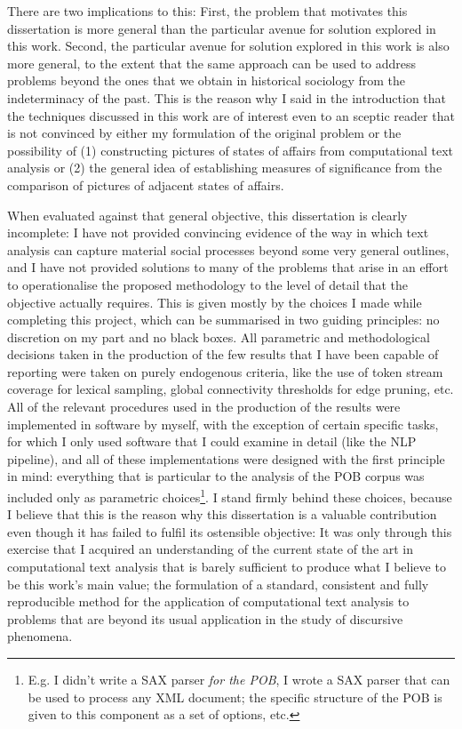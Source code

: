 There are two implications to this:
First, the problem that motivates this dissertation is more general than the particular avenue for solution explored in this work.
Second, the particular avenue for solution explored in this work is also more general, to the extent that the same approach can be used to address problems beyond the ones that we obtain in historical sociology from the indeterminacy of the past.
This is the reason why I said in the introduction that the techniques discussed in this work are of interest even to an sceptic reader that is not convinced by either my formulation of the original problem or the possibility of (1) constructing pictures of states of affairs from computational text analysis or (2) the general idea of establishing measures of significance from the comparison of pictures of adjacent states of affairs.

When evaluated against that general objective, this dissertation is clearly incomplete: I have not provided convincing evidence of the way in which text analysis can capture material social processes beyond some very general outlines, and I have not provided solutions to many of the problems that arise in an effort to operationalise the proposed methodology to the level of detail that the objective actually requires.
This is given mostly by the choices I made while completing this project, which can be summarised in two guiding principles: no discretion on my part and no black boxes.
All parametric and methodological decisions taken in the production of the few results that I have been capable of reporting were taken on purely endogenous criteria, like the use of token stream coverage for lexical sampling, global connectivity thresholds for edge pruning, etc.
All of the relevant procedures used in the production of the results were implemented in software by myself, with the exception of certain specific tasks, for which I only used software that I could examine in detail (like the NLP pipeline), and all of these implementations were designed with the first principle in mind: everything that is particular to the analysis of the POB corpus was included only as parametric choices\footnote{
    E.g. I didn't write a SAX parser \emph{for the POB}, I wrote a SAX parser that can be used to process any XML document; the specific structure of the POB is given to this component as a set of options, etc.
}.
I stand firmly behind these choices, because I believe that this is the reason why this dissertation is a valuable contribution even though it has failed to fulfil its ostensible objective:
It was only through this exercise that I acquired an understanding of the current state of the art in computational text analysis that is barely sufficient to produce what I believe to be this work's main value; the formulation of a standard, consistent and fully reproducible method for the application of computational text analysis to problems that are beyond its usual application in the study of discursive phenomena.

